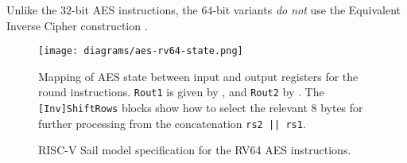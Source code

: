 Unlike the $32$-bit AES instructions, the $64$-bit variants
{\em do not} use the Equivalent Inverse Cipher
construction \cite[Section 5.3.5]{nist:fips:197}.

\begin{figure}[h]
\centering
\texttt{[image: diagrams/aes-rv64-state.png]}
\caption{
Mapping of AES state between input and output registers for the round
instructions.
{\tt Rout1} is given by ,
and
{\tt Rout2}          by .
The {\tt [Inv]ShiftRows} blocks show how to select the relevant $8$ bytes
for further processing from the concatenation {\tt rs2 || \tt rs1}.
}
\label{fig:aes:rv64:mapping}
\end{figure}

\begin{figure}[h!]

\caption{
RISC-V Sail model specification for the RV64 AES instructions.
}
\label{fig:pesudo:aes:rv64}
\end{figure}


